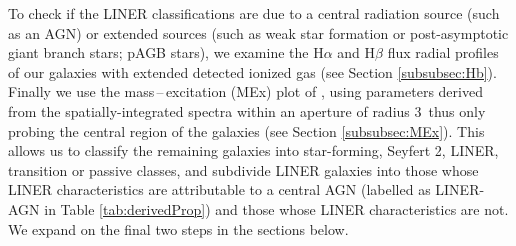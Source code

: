 \documentclass[a4paper,fleqn,usenatbib]{mnras}
\begin{document}
		To check if the LINER classifications are due to a central radiation source (such as an AGN) or extended sources (such as weak star formation or post-asymptotic giant branch stars; pAGB stars), we examine the H$\alpha$ and H$\beta$ flux radial profiles of our galaxies with extended detected ionized gas (see Section \ref{subsubsec:Hb}). Finally we use the mass\,--\,excitation (MEx) plot of \cite{Nyland2016}, using parameters derived from the spatially-integrated spectra within an aperture of radius 3\arcsec\ thus only probing the central region of the galaxies (see Section \ref{subsubsec:MEx}). This allows us to classify the remaining galaxies into star-forming, Seyfert 2, LINER, transition or passive classes, and subdivide LINER galaxies into those whose LINER characteristics are attributable to a central AGN (labelled as LINER-AGN in Table \ref{tab:derivedProp}) and those whose LINER characteristics are not. We expand on the final two steps in the sections below. 





\end{document}
